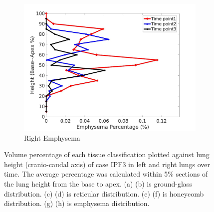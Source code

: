 \begin{figure}[H]
\begin{subfigure}{.42\linewidth}
  \includegraphics[width=\linewidth,trim={{.0\wd0} {.0\wd0} {.0\wd0} {.0\wd0}},clip]{Appendix/Image_AppexA/BaseToApex/IPF3RightLungEmphysemaDiseaseAgainstHeight.jpg}
  \caption{Right Emphysema}
  \label{fig:IPF3DiseaseAgainstHeight-h}
\end{subfigure}
\caption{Volume percentage of each tissue classification plotted against lung height (cranio-caudal axis) of case IPF3 in left and right lungs over time. The average percentage was calculated within 5\% sections of the lung height from the base to apex. (a) (b) is ground-glass distribution. (c) (d) is reticular distribution. (e) (f) is honeycomb distribution. (g) (h) is emphysema distribution.}
\label{fig:IPF3DiseaseAgainstHeight}
\end{figure}

